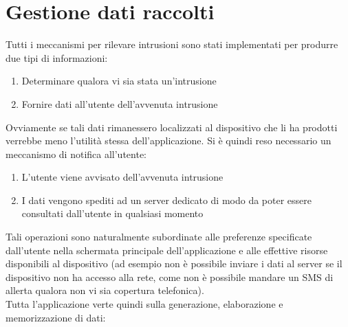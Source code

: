\section {Gestione dati raccolti}
Tutti i meccanismi per rilevare intrusioni sono stati implementati per produrre due tipi di informazioni:
\begin{enumerate}
  \item Determinare qualora vi sia stata un'intrusione
  \item Fornire dati all'utente dell'avvenuta intrusione
\end{enumerate}
Ovviamente se tali dati rimanessero localizzati al dispositivo che li ha prodotti verrebbe meno l'utilità stessa dell'applicazione. Si è quindi reso necessario un meccanismo di notifica all'utente:
\begin{enumerate}
  \item L'utente viene avvisato dell'avvenuta intrusione
  \item I dati vengono spediti ad un server dedicato di modo da poter essere consultati dall'utente in qualsiasi momento
\end{enumerate}
Tali operazioni sono naturalmente subordinate alle preferenze specificate dall'utente nella schermata principale dell'applicazione e alle effettive risorse disponibili al dispositivo (ad esempio non è possibile inviare i dati al server se il dispositivo non ha accesso alla rete, come non è possibile mandare un SMS di allerta qualora non vi sia copertura telefonica).\\
Tutta l'applicazione verte quindi sulla generazione, elaborazione e memorizzazione di dati:
